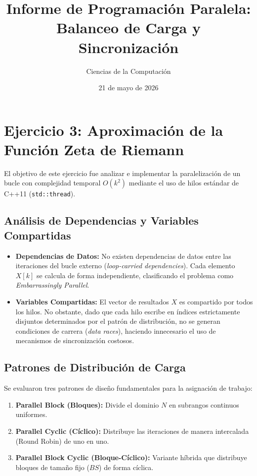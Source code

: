 \documentclass[11pt,a4paper]{article}
\title{Informe de Programación Paralela: Balanceo de Carga y Sincronización}
\author{Ciencias de la Computación}
\date{21 de mayo de 2026}
\begin{document}
\maketitle

\section{Ejercicio 3: Aproximación de la Función Zeta de Riemann}
El objetivo de este ejercicio fue analizar e implementar la paralelización de un bucle con complejidad temporal $O(k^2)$ mediante el uso de hilos estándar de C++11 (\texttt{std::thread}).

\subsection{Análisis de Dependencias y Variables Compartidas}
\begin{itemize}
    \item \textbf{Dependencias de Datos:} No existen dependencias de datos entre las iteraciones del bucle externo (\textit{loop-carried dependencies}). Cada elemento $X[k]$ se calcula de forma independiente, clasificando el problema como \textit{Embarrassingly Parallel}.
    \item \textbf{Variables Compartidas:} El vector de resultados $X$ es compartido por todos los hilos. No obstante, dado que cada hilo escribe en índices estrictamente disjuntos determinados por el patrón de distribución, no se generan condiciones de carrera (\textit{data races}), haciendo innecesario el uso de mecanismos de sincronización costosos.
\end{itemize}

\subsection{Patrones de Distribución de Carga}
Se evaluaron tres patrones de diseño fundamentales para la asignación de trabajo:
\begin{enumerate}
    \item \textbf{Parallel Block (Bloques):} Divide el dominio $N$ en subrangos continuos uniformes.
    \item \textbf{Parallel Cyclic (Cíclico):} Distribuye las iteraciones de manera intercalada (Round Robin) de uno en uno.
    \item \textbf{Parallel Block Cyclic (Bloque-Cíclico):} Variante híbrida que distribuye bloques de tamaño fijo ($BS$) de forma cíclica.
\end{enumerate}
\end{document}
